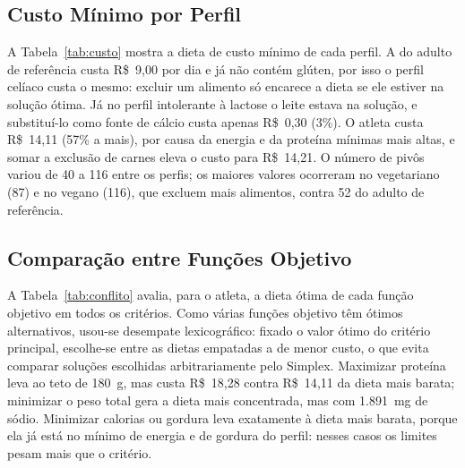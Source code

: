 \documentclass[12pt]{article}
\begin{document}
\subsection{Custo Mínimo por Perfil}

A Tabela~\ref{tab:custo} mostra a dieta de custo mínimo de cada perfil. A do adulto de
referência custa R\$~9{,}00 por dia e já não contém glúten, por isso o perfil
celíaco custa o mesmo: excluir um alimento só encarece a dieta se ele estiver na
solução ótima. Já no perfil intolerante à lactose o leite estava na solução, e substituí-lo como
fonte de cálcio custa apenas R\$~0{,}30 (3\%). O atleta custa
R\$~14{,}11 (57\% a mais), por causa da energia e da proteína mínimas
mais altas, e somar a exclusão de carnes eleva o custo para R\$~14{,}21. O número
de pivôs variou de 40 a 116 entre os perfis; os maiores valores
ocorreram no vegetariano (87) e no vegano (116), que excluem mais
alimentos, contra 52 do adulto de referência.

\begin{table}[ht]
\centering
\caption{Dieta de custo mínimo por perfil (modelo linear).}\label{tab:custo}
\footnotesize

\end{table}

\subsection{Comparação entre Funções Objetivo}

A Tabela~\ref{tab:conflito} avalia, para o atleta, a dieta ótima de cada função
objetivo em todos os critérios. Como várias funções objetivo têm ótimos alternativos,
usou-se desempate lexicográfico: fixado o valor ótimo do critério principal, escolhe-se
entre as dietas empatadas a de menor custo, o que evita comparar soluções escolhidas
arbitrariamente pelo Simplex. Maximizar proteína leva ao teto de 180~g, mas custa
R\$~18{,}28 contra R\$~14{,}11 da dieta mais barata; minimizar o peso
total gera a dieta mais concentrada, mas com 1.891~mg de sódio. Minimizar
calorias ou gordura leva exatamente à dieta mais barata, porque ela já está no mínimo de
energia e de gordura do perfil: nesses casos os limites pesam mais que o critério.

\begin{table}[ht]
\centering
\caption{Atleta: dieta ótima de cada função objetivo avaliada em todos os critérios.}\label{tab:conflito}
\footnotesize

\end{table}
\end{document}
